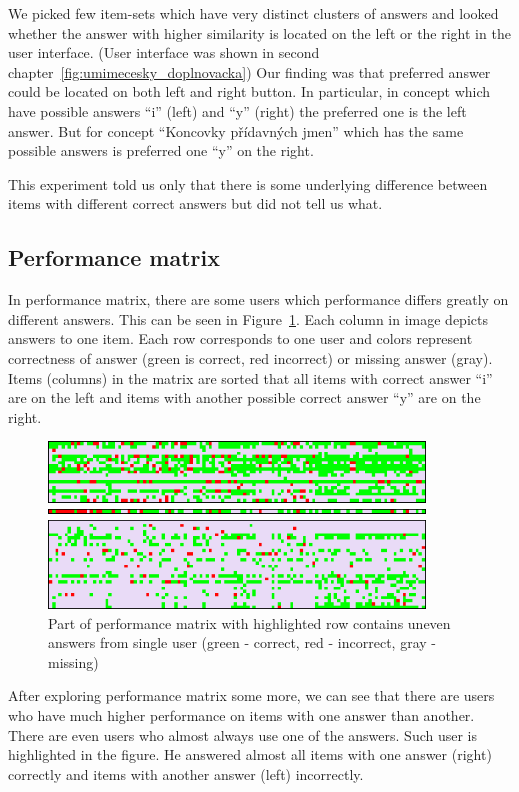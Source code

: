 \documentclass[
  printed, %
  table,   %
  nolof,     %
  nolot,     %
  color,
  final,
  nocover
]{fithesis3}
\begin{document}
We picked few item-sets which have very distinct clusters of answers and looked whether the answer with higher similarity is located on the left or the right in the user interface. (User interface was shown in second chapter~\ref{fig:umimecesky_doplnovacka}) Our finding was that preferred answer could be located on both left and right button. In particular, in concept \cviceniB{} which have possible answers ``i'' (left) and ``y'' (right) the preferred one is the left answer. But for concept ``Koncovky přídavných jmen'' which has the same possible answers is preferred one ``y'' on the right.

This experiment told us only that there is some underlying difference between items with different correct answers but did not tell us what.


\subsection{Performance matrix}\label{performance-matrix}

In performance matrix, there are some users which performance differs greatly on different answers. This can be seen in Figure~\ref{fig:performance_matrix}. Each column in image depicts answers to one item. Each row corresponds to one user and colors represent correctness of answer (green is correct, red incorrect) or missing answer (gray). Items (columns) in the matrix are sorted that all items with correct answer ``i'' are on the left and items with another possible correct answer ``y'' are on the right.

\begin{figure}
  \includegraphics[width=10cm]{img/performance_matrix}
  \caption{Part of performance matrix with highlighted row contains uneven answers from single user (green - correct, red - incorrect, gray - missing)}
  \label{fig:performance_matrix}
\end{figure}

After exploring performance matrix some more, we can see that there are users who have much higher performance on items with one answer than another. There are even users who almost always use one of the answers. Such user is highlighted in the figure. He answered almost all items with one answer (right) correctly and items with another answer (left) incorrectly.
\end{document}
